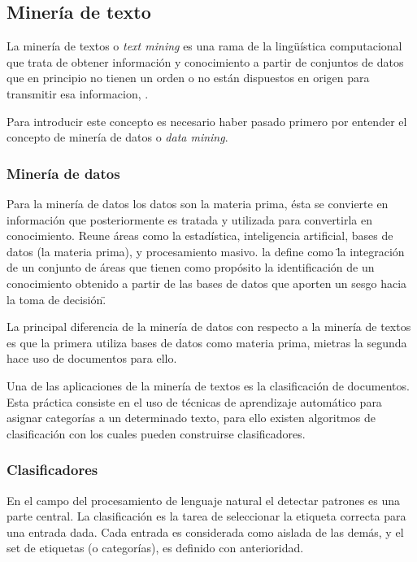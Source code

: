 \subsection{Minería de texto}
\label{subsec:MineriaTexto}

La minería de textos o \textit{text mining} es una rama de la lingüística computacional que trata de obtener información y conocimiento a partir de conjuntos de datos que en principio no tienen un orden o no están dispuestos en origen para transmitir esa informacion, \cite{IvanFernandez}.

Para introducir este concepto es necesario haber pasado primero por entender el concepto de minería de datos o \textit{data mining}.

\subsubsection*{Minería de datos}
\label{subsubsec:dataMining}

Para la minería de datos los datos son la materia prima, ésta se convierte en información que posteriormente es tratada y utilizada para convertirla en conocimiento. Reune áreas como la estadística, inteligencia artificial, bases de datos (la materia prima), y procesamiento masivo. \cite{LuisMolina} la define como \"la integración de un conjunto de áreas que tienen como propósito la identificación de un conocimiento obtenido a partir de las bases de datos que aporten un sesgo hacia la toma de decisión\".

La principal diferencia de la minería de datos con respecto a la minería de textos es que la primera utiliza bases de datos como materia prima, mietras la segunda hace uso de documentos para ello.

Una de las aplicaciones de la minería de textos es la clasificación de documentos. Esta práctica consiste en el uso de técnicas de aprendizaje automático para asignar categorías a un determinado texto, para ello existen algoritmos de clasificación con los cuales pueden construirse clasificadores.

\subsubsection*{Clasificadores}
\label{subsubsec:Classifiers}

En el campo del procesamiento de lenguaje natural el detectar patrones es una parte central. La clasificación es la tarea de seleccionar la etiqueta correcta para una entrada dada. Cada entrada es considerada como aislada de las demás, y el set de etiquetas (o categorías), es definido con anterioridad.

